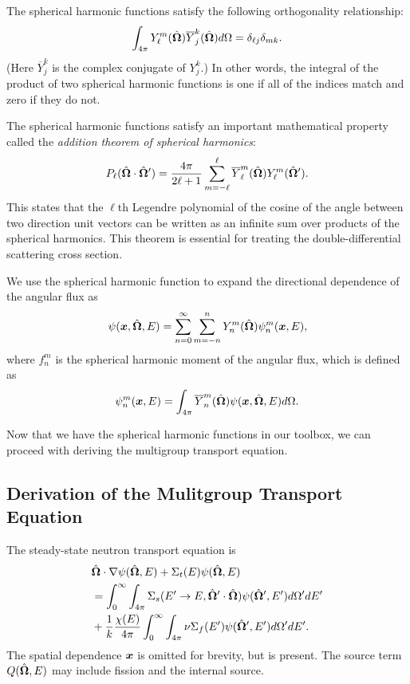 The spherical harmonic functions satisfy the following orthogonality relationship:
\begin{align}
  \int_{4\pi} Y_\ell^m(\hat{\mathbf{\Omega}}) \overline{Y}_j^k(\hat{\mathbf{\Omega}}) d\Omega = \delta_{\ell j} \delta_{m k}.
\end{align}
(Here $\overline{Y}_j^k$ is the complex conjugate of $Y_j^k$.) In other words, the integral of the product of two spherical harmonic functions is one if all of the indices match and zero if they do not.

The spherical harmonic functions satisfy an important mathematical property called the \emph{addition theorem of spherical harmonics}:
\begin{align} \label{Eq:SphericalHarmonicsAdditionTheorem}
  P_\ell(\hat{\mathbf{\Omega}} \cdot \hat{\mathbf{\Omega}}') = \frac{ 4\pi }{ 2\ell + 1 } \sum_{m=-\ell}^\ell \overline{Y}_\ell^m (\hat{\mathbf{\Omega}}) Y_\ell^m (\hat{\mathbf{\Omega}}'). 
\end{align}
This states that the $\ell$th Legendre polynomial of the cosine of the angle between two direction unit vectors can be written as an infinite sum over products of the spherical harmonics. This theorem is essential for treating the double-differential scattering cross section.

We use the spherical harmonic function to expand the directional dependence of the angular flux as
\begin{align}
  \psi(\bm{x},\hat{\mathbf{\Omega}},E) = \sum_{n=0}^\infty \sum_{m=-n}^n Y_n^m(\hat{\mathbf{\Omega}}) \psi_n^m(\bm{x},E),
\end{align}
where $f_n^m$ is the spherical harmonic moment of the angular flux, which is defined as
\begin{align}
  \psi_n^m(\bm{x},E) = \int_{4\pi} \overline{Y}_n^m(\hat{\mathbf{\Omega}}) \psi(\bm{x},\hat{\mathbf{\Omega}},E) d\Omega .
\end{align}

Now that we have the spherical harmonic functions in our toolbox, we can proceed with deriving the multigroup transport equation.

\subsection{Derivation of the Mulitgroup Transport Equation}

The steady-state neutron transport equation is
\begin{align}
  &\hat{\mathbf{\Omega}} \cdot \nabla \psi(\hat{\mathbf{\Omega}},E) + \Sigma_t(E) \psi(\hat{\mathbf{\Omega}},E) \nonumber \\
  &= \int_0^\infty \int_{4\pi} \Sigma_s(E' \rightarrow E, \hat{\mathbf{\Omega}}' \cdot \hat{\mathbf{\Omega}}) \psi(\hat{\mathbf{\Omega}}',E') d\Omega' dE' \nonumber \\
  &+ \frac{1}{k} \frac{\chi(E)}{4\pi}  \int_0^\infty \int_{4\pi} \nu\Sigma_f(E') \psi(\hat{\mathbf{\Omega}}',E') d\Omega' dE'.
\end{align}
The spatial dependence $\bm{x}$ is omitted for brevity, but is present. The source term $Q(\hat{\mathbf{\Omega}},E)$ may include fission and the internal source.

